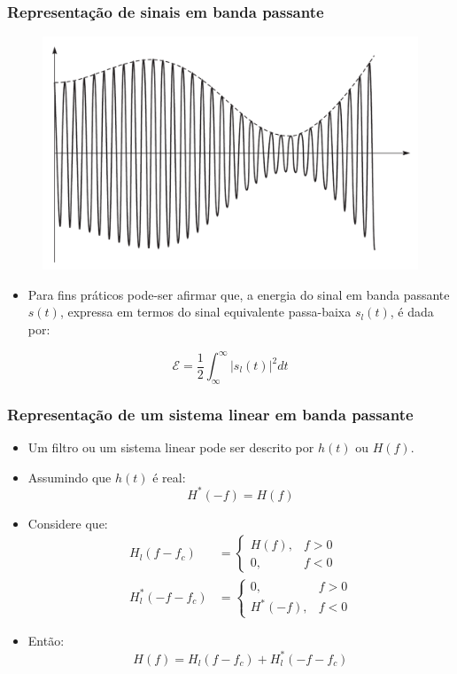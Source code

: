 \begin{frame}
	\frametitle{Representação de sinais em banda passante}

	\begin{figure}[t]
	  \begin{center}
	    \includegraphics[width=0.5\columnwidth]{figs/fig02-01-04}
	  \end{center}
	\end{figure}

	\begin{itemize}
	  \item Para fins práticos pode-ser afirmar que, a energia do sinal em banda passante $s(t)$, expressa em termos do sinal equivalente passa-baixa $s_l(t)$, é dada por:
	\end{itemize}
	\begin{equation*}
	      \mathcal{E} = \frac{1}{2} \int_{\infty}^{\infty} |s_l(t)|^2 dt
	\end{equation*}


\end{frame}

\begin{frame}
	\frametitle{Representação de um sistema linear em banda passante}

	\begin{itemize}
	  \item Um filtro ou um sistema linear pode ser descrito por $h(t)$ ou $H(f)$.
	  \item Assumindo que $h(t)$ é real:
	  	\begin{equation*}
	      H^*(-f) = H(f)
	\end{equation*}
	  \item Considere que:
	\begin{align*}
	      H_l(f-f_c) &= \begin{cases}
				H(f) , &f > 0 \\
			        0, &f < 0 
	                    \end{cases} \\
	      H_l^*(-f-f_c) &= \begin{cases}
				0, &f > 0 \\
			        H^*(-f), &f < 0 
	                    \end{cases}
	\end{align*}
	 \item Então:
	\begin{equation*}
	    H(f) = H_l(f-f_c) + H_l^*(-f-f_c)
	\end{equation*}
	\end{itemize}


\end{frame}

